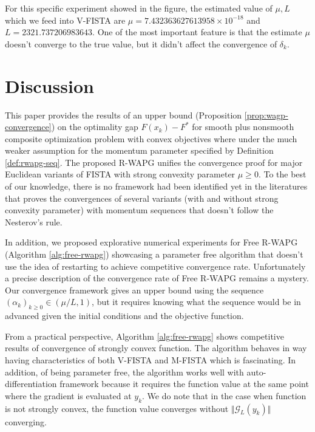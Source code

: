 \documentclass[12pt]{article}
\begin{document}
            For this specific experiment showed in the figure, the estimated value of $\mu, L$ which we feed into V-FISTA are $\mu = 7.432363627613958\times 10^{-18}$ and $L = 2321.737206983643$. 
            One of the most important feature is that the estimate $\mu$ doesn't converge to the true value, but it didn't affect the convergence of $\delta_k$. 

\section{Discussion}
    This paper provides the results of an upper bound (Proposition \ref{prop:wagp-convergence}) on the optimality gap $F(x_k) - F^*$ for smooth plus nonsmooth composite optimization problem with convex objectives where under the much weaker assumption for the momentum parameter specified by Definition \ref{def:rwapg-seq}. 
    The proposed R-WAPG unifies the convergence proof for major Euclidean variants of FISTA with strong convexity parameter $\mu \ge 0$. 
    To the best of our knowledge, there is no framework had been identified yet in the literatures that proves the convergences of several variants (with and without strong convexity parameter) with momentum sequences that doesn't follow the Nesterov's rule. 
    \par
    In addition, we proposed explorative numerical experiments for Free R-WAPG (Algorithm \ref{alg:free-rwapg}) showcasing a parameter free algorithm that doesn't use the idea of restarting to achieve competitive convergence rate. 
    Unfortunately a precise description of the convergence rate of Free R-WAPG remains a mystery. 
    Our convergence framework gives an upper bound using the sequence $(\alpha_k)_{k \ge 0} \in (\mu/L, 1)$, but it requires knowing what the sequence would be in advanced given the initial conditions and the objective function. 
    \par
    From a practical perspective, Algorithm \ref{alg:free-rwapg} shows competitive results of convergence of strongly convex function.  
    The algorithm behaves in way having characteristics of both V-FISTA and M-FISTA which is fascinating. 
    In addition, of being parameter free, the algorithm works well with auto-differentiation framework because it requires the function value at the same point where the gradient is evaluated at $y_k$. 
    We do note that in the case when function is not strongly convex, the function value converges without $\Vert \mathcal G_L(y_k)\Vert$ converging. 




            
            

            




\appendix
\end{document}
